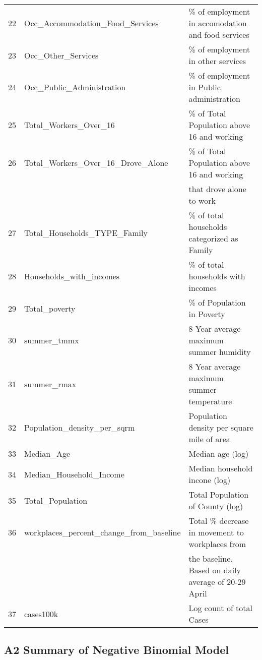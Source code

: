 \documentclass[
]{article}
\begin{document}
\begin{table}[ht]
{\begin{tabular}{rll}
  22 & Occ\_Accommodation\_Food\_Services & \% of employment in accomodation and food services \\ 
  23 & Occ\_Other\_Services & \% of employment in other services \\ 
  24 & Occ\_Public\_Administration & \% of employment in Public administration \\ 
  25 & Total\_Workers\_Over\_16 & \% of Total Population above 16 and working \\ 
  26 & Total\_Workers\_Over\_16\_Drove\_Alone & \% of Total Population above 16 and working \\
& &  that drove alone to work \\ 
  27 & Total\_Households\_TYPE\_Family & \% of total households categorized as Family \\ 
  28 & Households\_with\_incomes & \% of total households with incomes \\ 
  29 & Total\_poverty & \% of Population in Poverty \\ 
  30 & summer\_tmmx & 8 Year average maximum summer humidity \\ 
  31 & summer\_rmax & 8 Year average maximum summer temperature \\ 
  32 & Population\_density\_per\_sqrm & Population density per square mile of area \\ 
  33 & Median\_Age & Median age (log) \\ 
  34 & Median\_Household\_Income & Median household incone (log) \\ 
  35 & Total\_Population & Total Population of County (log) \\ 
  36 & workplaces\_percent\_change\_from\_baseline & Total \% decrease in movement to workplaces from \\
& &  the baseline. Based on daily average of 20-29 April  \\ 
  37 & cases100k & Log count of total Cases \\ 
   \hline
\end{tabular}}
\end{table}

\newpage

\hypertarget{a2-summary-of-negative-binomial-model}{%
\subsection{A2 Summary of Negative Binomial
Model}\label{a2-summary-of-negative-binomial-model}}
\end{document}
